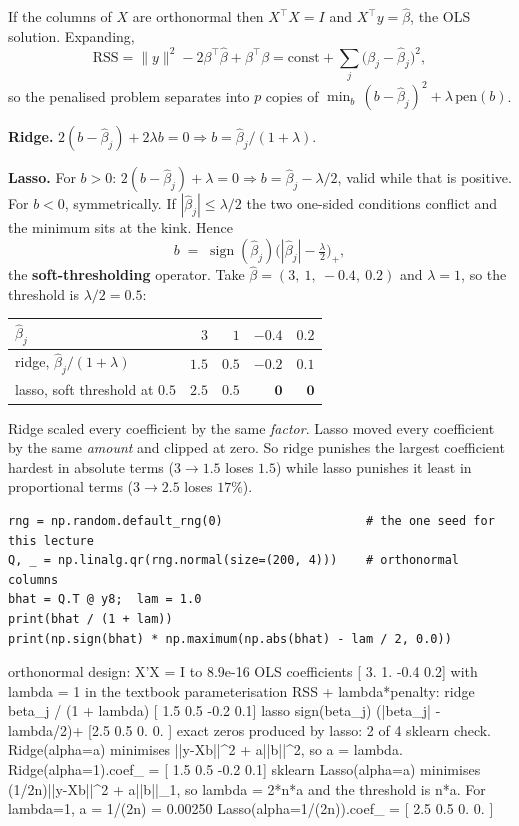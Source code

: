 \documentclass[11pt]{article}
\newcommand{\bhat}{\hat\beta}
\newcommand{\XtX}{X^{\!\top}\!X}
\newcommand{\Xty}{X^{\!\top}y}
\begin{document}
\begin{worked}[Both penalties solved exactly, when $\XtX = I$]
If the columns of $X$ are orthonormal then $\XtX = I$ and $\Xty = \bhat$, the
OLS solution. Expanding,
\[
  \text{RSS} = \|y\|^2 - 2\beta^{\!\top}\bhat + \beta^{\!\top}\beta
  = \text{const} + \sum_{j}\big(\beta_j - \bhat_j\big)^2 ,
\]
so the penalised problem separates into $p$ copies of
$\min_{b}\,(b - \bhat_j)^2 + \lambda\,\text{pen}(b)$.

\textbf{Ridge.} $2(b - \bhat_j) + 2\lambda b = 0
\Rightarrow b = \bhat_j/(1+\lambda)$.

\textbf{Lasso.} For $b > 0$: $2(b - \bhat_j) + \lambda = 0
\Rightarrow b = \bhat_j - \lambda/2$, valid while that is positive. For
$b < 0$, symmetrically. If $|\bhat_j| \le \lambda/2$ the two one-sided
conditions conflict and the minimum sits at the kink. Hence
\[
  b \;=\; \operatorname{sign}(\bhat_j)\Big(|\bhat_j| -
  \tfrac{\lambda}{2}\Big)_{+} ,
\]
the \textbf{soft-thresholding} operator. Take
$\bhat = (3,\ 1,\ -0.4,\ 0.2)$ and $\lambda = 1$, so the threshold is
$\lambda/2 = 0.5$:
\begin{center}
\begin{tabular}{@{}lrrrr@{}}
\toprule
$\bhat_j$ & $3$ & $1$ & $-0.4$ & $0.2$\\
\midrule
ridge, $\bhat_j/(1+\lambda)$ & $1.5$ & $0.5$ & $-0.2$ & $0.1$\\
lasso, soft threshold at $0.5$ & $2.5$ & $0.5$ & $\mathbf{0}$ & $\mathbf{0}$\\
\bottomrule
\end{tabular}
\end{center}
Ridge scaled every coefficient by the same \emph{factor}. Lasso moved every
coefficient by the same \emph{amount} and clipped at zero. So ridge punishes
the largest coefficient hardest in absolute terms ($3 \to 1.5$ loses $1.5$)
while lasso punishes it least in proportional terms ($3 \to 2.5$ loses
$17\%$).
\end{worked}

\begin{lstlisting}
rng = np.random.default_rng(0)                    # the one seed for this lecture
Q, _ = np.linalg.qr(rng.normal(size=(200, 4)))    # orthonormal columns
bhat = Q.T @ y8;  lam = 1.0
print(bhat / (1 + lam))
print(np.sign(bhat) * np.maximum(np.abs(bhat) - lam / 2, 0.0))
\end{lstlisting}
\begin{codeout}
orthonormal design: X'X = I to 8.9e-16
OLS coefficients         [ 3.   1.  -0.4  0.2]
with lambda = 1 in the textbook parameterisation RSS + lambda*penalty:
  ridge  beta_j / (1 + lambda)               [ 1.5  0.5 -0.2  0.1]
  lasso  sign(beta_j) (|beta_j| - lambda/2)+ [2.5 0.5 0.  0. ]
  exact zeros produced by lasso: 2 of 4
sklearn check. Ridge(alpha=a) minimises ||y-Xb||^2 + a||b||^2, so a = lambda.
  Ridge(alpha=1).coef_ = [ 1.5  0.5 -0.2  0.1]
sklearn Lasso(alpha=a) minimises (1/2n)||y-Xb||^2 + a||b||_1,
  so lambda = 2*n*a and the threshold is n*a. For lambda=1, a = 1/(2n) = 0.00250
  Lasso(alpha=1/(2n)).coef_ = [ 2.5  0.5 0.  0. ]
\end{codeout}
\end{document}
